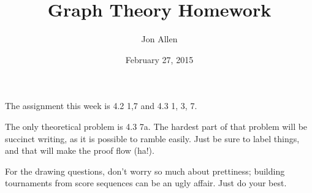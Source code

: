 \documentclass[letterpaper]{article}
\begin{document}
\title{Graph Theory Homework}
\date{February 27, 2015}
\author{Jon Allen}
\maketitle
\renewcommand{\labelenumi}{4.\arabic{enumi}}
\renewcommand{\labelenumii}{\arabic{enumii}.}
\renewcommand{\labelenumiii}{(\alph{enumiii})}
\renewcommand\thefigure{4.\arabic{figure}}
The assignment this week is 4.2 1,7 and 4.3 1, 3, 7.

The only theoretical problem is 4.3 7a.  The hardest part of that problem will be succinct writing, as it is possible to ramble easily.  Just be sure to label things, and that will make the proof flow (ha!).  

For the drawing questions, don't worry so much about prettiness; building tournaments from score sequences can be an ugly affair.  Just do your best.
\end{document}
